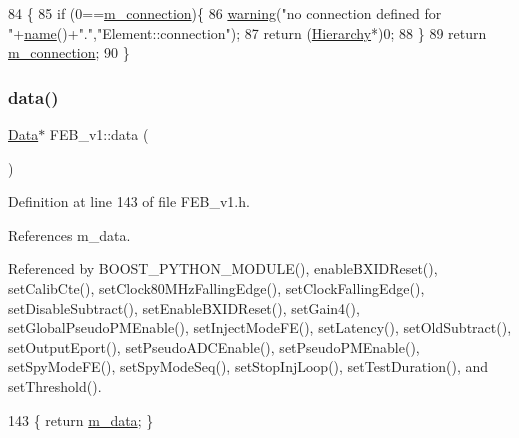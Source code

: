 \begin{DoxyCode}
84                               \{
85   \textcolor{keywordflow}{if} (0==\hyperlink{classElement_abe3de7a5dbbc9a6dd2d7e012e5fdb266}{m\_connection})\{
86     \hyperlink{classObject_a65cd4fda577711660821fd2cd5a3b4c9}{warning}(\textcolor{stringliteral}{"no connection defined for "}+\hyperlink{classObject_a300f4c05dd468c7bb8b3c968868443c1}{name}()+\textcolor{stringliteral}{"."},\textcolor{stringliteral}{"Element::connection"});
87     \textcolor{keywordflow}{return} (\hyperlink{classHierarchy}{Hierarchy}*)0;
88   \}
89   \textcolor{keywordflow}{return} \hyperlink{classElement_abe3de7a5dbbc9a6dd2d7e012e5fdb266}{m\_connection};
90 \}
\end{DoxyCode}
\mbox{\label{classFEB__v1_a6bca4320bd3bbbc32efc81097f33421a}} 
\subsubsection{\texorpdfstring{data()}{data()}}
{\footnotesize\ttfamily \hyperlink{classData}{Data}$\ast$ F\+E\+B\+\_\+v1\+::data (\begin{DoxyParamCaption}{ }\end{DoxyParamCaption})\hspace{0.3cm}{\ttfamily [inline]}}



Definition at line 143 of file F\+E\+B\+\_\+v1.\+h.



References m\+\_\+data.



Referenced by B\+O\+O\+S\+T\+\_\+\+P\+Y\+T\+H\+O\+N\+\_\+\+M\+O\+D\+U\+L\+E(), enable\+B\+X\+I\+D\+Reset(), set\+Calib\+Cte(), set\+Clock80\+M\+Hz\+Falling\+Edge(), set\+Clock\+Falling\+Edge(), set\+Disable\+Subtract(), set\+Enable\+B\+X\+I\+D\+Reset(), set\+Gain4(), set\+Global\+Pseudo\+P\+M\+Enable(), set\+Inject\+Mode\+F\+E(), set\+Latency(), set\+Old\+Subtract(), set\+Output\+Eport(), set\+Pseudo\+A\+D\+C\+Enable(), set\+Pseudo\+P\+M\+Enable(), set\+Spy\+Mode\+F\+E(), set\+Spy\+Mode\+Seq(), set\+Stop\+Inj\+Loop(), set\+Test\+Duration(), and set\+Threshold().


\begin{DoxyCode}
143 \{ \textcolor{keywordflow}{return} \hyperlink{classFEB__v1_a1c9dbc3660021dba1f58666d0097abb0}{m\_data}; \}
\end{DoxyCode}
\mbox{\label{classObject_aac010553f022165573714b7014a15f0d}} 
